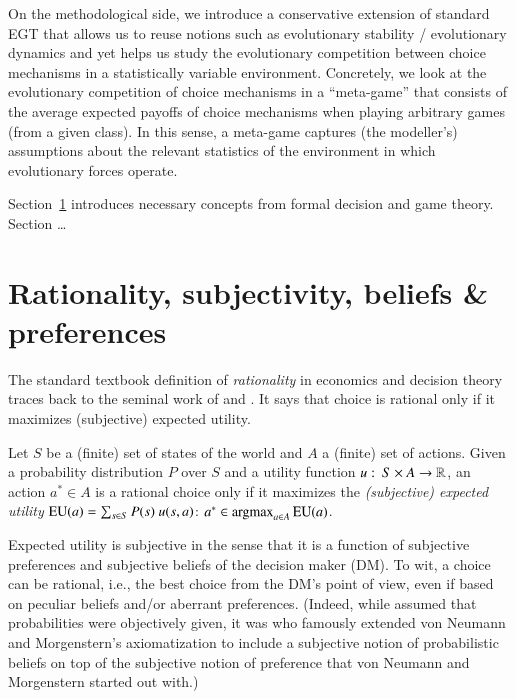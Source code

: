 \documentclass[fleqn,reqno,11pt]{article}
\begin{document}
On the methodological side, we introduce a conservative extension of standard EGT that allows
us to reuse notions such as evolutionary stability / evolutionary dynamics and yet helps us
study the evolutionary competition between choice mechanisms in a statistically variable
environment. Concretely, we look at the evolutionary competition of choice mechanisms in a
``meta-game'' that consists of the average expected payoffs of choice mechanisms when playing
arbitrary games (from a given class). In this sense, a meta-game captures (the modeller's)
assumptions about the relevant statistics of the environment in which evolutionary forces
operate.

Section~\ref{sec:rati--subj} introduces necessary concepts from formal decision and game
theory. Section \dots


\section{Rationality, subjectivity, beliefs \& preferences}
\label{sec:rati--subj}

The standard textbook definition of \textit{rationality} in economics and decision theory
traces back to the seminal work of \citet{Neumannvon-NeumannMorgenstern1944:Theory-of-Games}
and \citet{Savage1954:The-Foundations}. It says that choice is rational only if it maximizes
(subjective) expected utility.

\begin{definition} Let $S$ be a (finite)
  set of states of the world and $A$ a (finite) set of actions. Given a probability
  distribution $P$ over $S$ and a utility function
  $u \thinspace \colon \thinspace S \times A \rightarrow \mathbb{R} $, an action $a^* \in A$ is a rational choice
  only if it maximizes the \emph{(subjective) expected utility}
  $\EU(a) = \sum_{s \in S} P(s) \ u(s, a)$: $a^* \in \text{argmax}_{a \in A} \operatorname{EU}(a)
  $.
\end{definition}

\noindent Expected utility is subjective in the sense that it is a function of subjective
preferences and subjective beliefs of the decision maker (DM). To wit, a choice can be
rational, i.e., the best choice from the DM's point of view, even if based on peculiar beliefs
and/or aberrant preferences. (Indeed, while
\citeauthor{Neumannvon-NeumannMorgenstern1944:Theory-of-Games} assumed that probabilities were
objectively given, it was \citet{Savage1954:The-Foundations} who famously extended von Neumann
and Morgenstern's axiomatization to include a subjective notion of probabilistic beliefs on top
of the subjective notion of preference that von Neumann and Morgenstern started out with.)
\end{document}
